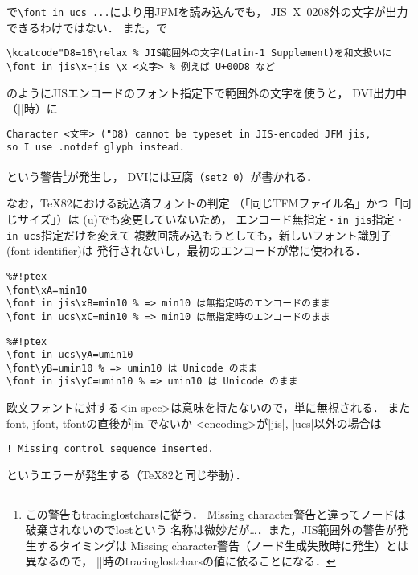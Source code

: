 \documentclass[a4paper,11pt,nomag,dvipdfmx]{jsarticle}
\begin{document}
\begin{dangerous}
  \pTeX で\verb|\font in ucs ...|により\upTeX 用JFMを読み込んでも，
  JIS~X~0208外の文字が出力できるわけではない．
  また，\upTeX で
\begin{verbatim}
\kcatcode"D8=16\relax % JIS範囲外の文字(Latin-1 Supplement)を和文扱いに
\font in jis\x=jis \x <文字> % 例えば U+00D8 など
\end{verbatim}
  のようにJISエンコードのフォント指定下で範囲外の文字を使うと，
  DVI出力中（|\shipout|時）に
\begin{verbatim}
Character <文字> ("D8) cannot be typeset in JIS-encoded JFM jis,
so I use .notdef glyph instead.
\end{verbatim}
  という警告\footnote{この警告も\.{tracinglostchars}に従う．
  Missing character警告と違ってノードは破棄されないのでlostという
  名称は微妙だが…．また，JIS範囲外の警告が発生するタイミングは
  Missing character警告（ノード生成失敗時に発生）とは異なるので，
  |\shipout|時の\.{tracinglostchars}の値に依ることになる．}が発生し，
  DVIには豆腐（\verb|set2 0|）が書かれる．
\end{dangerous}

\begin{dangerous}
  なお，\TeX82における読込済フォントの判定
  （「同じTFMファイル名」かつ「同じサイズ」）は
  (u)\pTeX でも変更していないため，
  エンコード無指定・\verb|in jis|指定・\verb|in ucs|指定だけを変えて
  複数回読み込もうとしても，新しいフォント識別子(font identifier)は
  発行されないし，最初のエンコードが常に使われる．
\begin{verbatim}
%#!ptex
\font\xA=min10
\font in jis\xB=min10 % => min10 は無指定時のエンコードのまま
\font in ucs\xC=min10 % => min10 は無指定時のエンコードのまま
\end{verbatim}
\begin{verbatim}
%#!ptex
\font in ucs\yA=umin10
\font\yB=umin10 % => umin10 は Unicode のまま
\font in jis\yC=umin10 % => umin10 は Unicode のまま
\end{verbatim}
\end{dangerous}

\begin{dangerous}
  欧文フォントに対する<in spec>は意味を持たないので，単に無視される．
  また\.{font}, \.{jfont}, \.{tfont}の直後が|in|でないか
  <encoding>が|jis|, |ucs|以外の場合は
\begin{verbatim}
! Missing control sequence inserted.
\end{verbatim}
  というエラーが発生する（\TeX82と同じ挙動）．
\end{dangerous}
\end{document}
